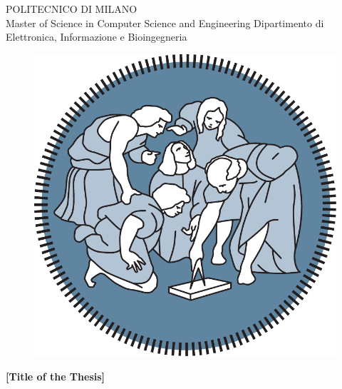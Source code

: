 \thispagestyle{empty}
\vspace*{-1.5cm}

\bfseries{
\begin{center}

\large
POLITECNICO DI MILANO\\
\normalsize
Master of Science in Computer Science and Engineering
Dipartimento di Elettronica, Informazione e Bioingegneria

 
\vspace{5mm}


\begin{figure}[h]
\begin{center}
\includegraphics[scale=.275]{logo_polimi.pdf}
\end{center}
\end{figure}

\vspace{1cm}
\LARGE
\textbf{[Title of the Thesis]}\\


\vspace{2cm}


\end{center}}
